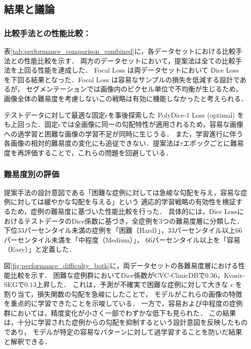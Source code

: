 \documentclass[a4paper,platex,dvipdfmx,twocolumn]{jsarticle}
\begin{document}
\subsection{結果と議論}

\subsubsection{比較手法との性能比較：}
表\ref{tab:performance_comparison_combined}に，各データセットにおける比較手法との性能比較を示す．
両方のデータセットにおいて，提案法は全ての比較手法を上回る性能を達成した．
Focal Loss は両データセットにおいて Dice Loss を下回る結果となった．Focal Loss は容易なサンプルの損失を低減する設計であるが，
セグメンテーションでは画像内のピクセル単位で不均衡が生じるため，画像全体の難易度を考慮しないこの戦略は有効に機能しなかったと考えられる．

テストデータに対して最適な固定$\epsilon$を事後探索した
PolyDice-1 Loss (optimal) をも上回った．固定$\epsilon$では全画像に同一の勾配特性が適用されるため，容易な画像への過学習と困難な画像の学習不足が同時に生じうる．
また，学習進行に伴う各画像の相対的難易度の変化にも追従できない．提案法は$\tau$エポックごとに難易度を再評価することで，これらの問題を回避している．

\subsubsection{難易度別の評価}
提案手法の設計意図である「困難な症例に対しては急峻な勾配を与え，容易な症例に対しては緩やかな勾配を与える」という
適応的学習戦略の有効性を検証するため，症例の難易度に基づいた性能比較を行った．
具体的には，Dice LossにおけるテストデータのDice係数に基づき，全症例を3つの難易度層に分類した．
下位$33$パーセンタイル未満の症例を「困難（Hard）」，$33$パーセンタイル以上$66$パーセンタイル未満を「中程度（Medium）」，
$66$パーセンタイル以上を「容易（Easy）」と定義した．

図\ref{fig:performance_difficulty_both}に，両データセットの各難易度層における性能比較を示す．
困難な症例群においてDice係数がCVC-ClinicDBで$0.36$，Kvasir-SEGで$0.13$上昇した． これは，予測が不確実で困難な症例に対して大きな $\epsilon$ を割り当て，損失関数の勾配を急峻にしたことで，
モデルがこれらの画像の特徴を重点的に学習できたことを示唆している．
一方で，容易および中程度の症例群においては，精度変化が小さく一部でわずかな低下も見られた．
この結果は，十分に学習された症例からの勾配を抑制するという設計意図を反映したものであり，
モデルが特定の容易なパターンに対して過学習することを防いだ結果と解釈できる．
\end{document}
